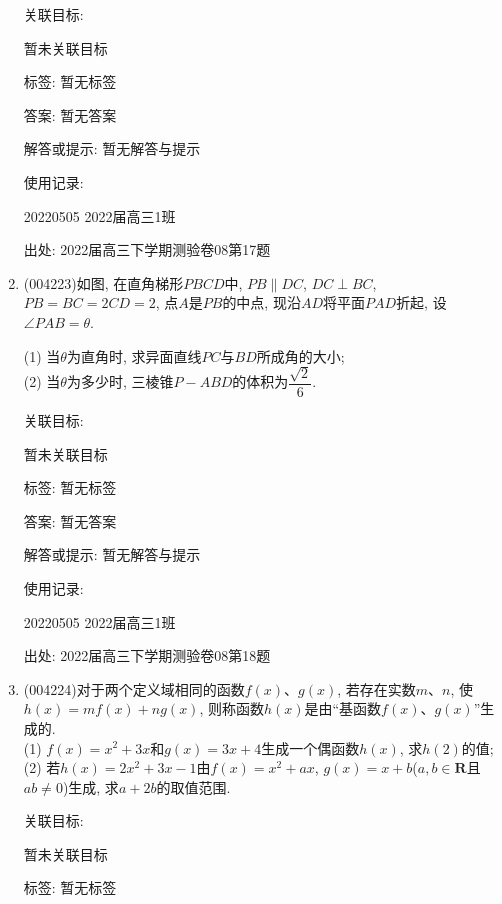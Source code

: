 \documentclass[10pt,a4paper]{article}
\begin{document}
\begin{enumerate}[1.]
关联目标:

暂未关联目标



标签: 暂无标签

答案: 暂无答案

解答或提示: 暂无解答与提示

使用记录:

20220505	2022届高三1班		


出处: 2022届高三下学期测验卷08第17题
\item { (004223)}如图, 在直角梯形$PBCD$中, $PB\parallel DC$, $DC\perp BC$, $PB=BC=2CD=2$, 点$A$是$PB$的中点, 现沿$AD$将平面$PAD$折起, 设$\angle PAB=\theta$.
\begin{center}
\end{center}
(1) 当$\theta$为直角时, 求异面直线$PC$与$BD$所成角的大小;\\
(2) 当$\theta$为多少时, 三棱锥$P-ABD$的体积为$\dfrac{\sqrt 2}6$.


关联目标:

暂未关联目标



标签: 暂无标签

答案: 暂无答案

解答或提示: 暂无解答与提示

使用记录:

20220505	2022届高三1班		


出处: 2022届高三下学期测验卷08第18题
\item { (004224)}对于两个定义域相同的函数$f(x)$、$g(x)$, 若存在实数$m$、$n$, 使$h(x)=mf(x)+ng(x)$, 则称函数$h(x)$是由``基函数$f(x)$、$g(x)$''生成的.\\
(1) $f(x)=x^2+3x$和$g(x)=3x+4$生成一个偶函数$h(x)$, 求$h(2)$的值;\\
(2) 若$h(x)=2x^2+3x-1$由$f(x)=x^2+ax$, $g(x)=x+b$($a,b\in \mathbf{R}$且$ab\ne 0$)生成, 求$a+2b$的取值范围.


关联目标:

暂未关联目标



标签: 暂无标签


\end{enumerate}
\end{document}
